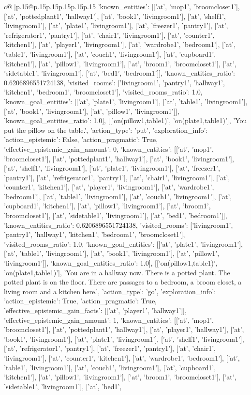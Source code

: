 \documentclass{article}
\begin{document}
{\begin{supertabular}{c@{$\;$}|p{.15\linewidth}@{}p{.15\linewidth}p{.15\linewidth}p{.15\linewidth}p{.15\linewidth}p{.15\linewidth}}
{{{'known_entities': [['at', 'mop1', 'broomcloset1'], ['at', 'pottedplant1', 'hallway1'], ['at', 'book1', 'livingroom1'], ['at', 'shelf1', 'livingroom1'], ['at', 'plate1', 'livingroom1'], ['at', 'freezer1', 'pantry1'], ['at', 'refrigerator1', 'pantry1'], ['at', 'chair1', 'livingroom1'], ['at', 'counter1', 'kitchen1'], ['at', 'player1', 'livingroom1'], ['at', 'wardrobe1', 'bedroom1'], ['at', 'table1', 'livingroom1'], ['at', 'couch1', 'livingroom1'], ['at', 'cupboard1', 'kitchen1'], ['at', 'pillow1', 'livingroom1'], ['at', 'broom1', 'broomcloset1'], ['at', 'sidetable1', 'livingroom1'], ['at', 'bed1', 'bedroom1']], 'known_entities_ratio': 0.6206896551724138, 'visited_rooms': ['livingroom1', 'pantry1', 'hallway1', 'kitchen1', 'bedroom1', 'broomcloset1'], 'visited_rooms_ratio': 1.0, 'known_goal_entities': [['at', 'plate1', 'livingroom1'], ['at', 'table1', 'livingroom1'], ['at', 'book1', 'livingroom1'], ['at', 'pillow1', 'livingroom1']], 'known_goal_entities_ratio': 1.0}}], [['on(pillow1,table1)', 'on(plate1,table1)'], 'You put the pillow on the table.', {'action_type': 'put', 'exploration_info': {'action_epistemic': False, 'action_pragmatic': True, 'effective_epistemic_gain_amount': 0, 'known_entities': [['at', 'mop1', 'broomcloset1'], ['at', 'pottedplant1', 'hallway1'], ['at', 'book1', 'livingroom1'], ['at', 'shelf1', 'livingroom1'], ['at', 'plate1', 'livingroom1'], ['at', 'freezer1', 'pantry1'], ['at', 'refrigerator1', 'pantry1'], ['at', 'chair1', 'livingroom1'], ['at', 'counter1', 'kitchen1'], ['at', 'player1', 'livingroom1'], ['at', 'wardrobe1', 'bedroom1'], ['at', 'table1', 'livingroom1'], ['at', 'couch1', 'livingroom1'], ['at', 'cupboard1', 'kitchen1'], ['at', 'pillow1', 'livingroom1'], ['at', 'broom1', 'broomcloset1'], ['at', 'sidetable1', 'livingroom1'], ['at', 'bed1', 'bedroom1']], 'known_entities_ratio': 0.6206896551724138, 'visited_rooms': ['livingroom1', 'pantry1', 'hallway1', 'kitchen1', 'bedroom1', 'broomcloset1'], 'visited_rooms_ratio': 1.0, 'known_goal_entities': [['at', 'plate1', 'livingroom1'], ['at', 'table1', 'livingroom1'], ['at', 'book1', 'livingroom1'], ['at', 'pillow1', 'livingroom1']], 'known_goal_entities_ratio': 1.0}}], [['on(pillow1,table1)', 'on(plate1,table1)'], 'You are in a hallway now. There is a potted plant. The potted plant is on the floor. There are passages to a bedroom, a broom closet, a living room and a kitchen here.', {'action_type': 'go', 'exploration_info': {'action_epistemic': True, 'action_pragmatic': True, 'effective_epistemic_gain_facts': [['at', 'player1', 'hallway1']], 'effective_epistemic_gain_amount': 1, 'known_entities': [['at', 'mop1', 'broomcloset1'], ['at', 'pottedplant1', 'hallway1'], ['at', 'player1', 'hallway1'], ['at', 'book1', 'livingroom1'], ['at', 'plate1', 'livingroom1'], ['at', 'shelf1', 'livingroom1'], ['at', 'refrigerator1', 'pantry1'], ['at', 'freezer1', 'pantry1'], ['at', 'chair1', 'livingroom1'], ['at', 'counter1', 'kitchen1'], ['at', 'wardrobe1', 'bedroom1'], ['at', 'table1', 'livingroom1'], ['at', 'couch1', 'livingroom1'], ['at', 'cupboard1', 'kitchen1'], ['at', 'pillow1', 'livingroom1'], ['at', 'broom1', 'broomcloset1'], ['at', 'sidetable1', 'livingroom1'], ['at', 'bed1', }}}
\end{supertabular}}
\end{document}
